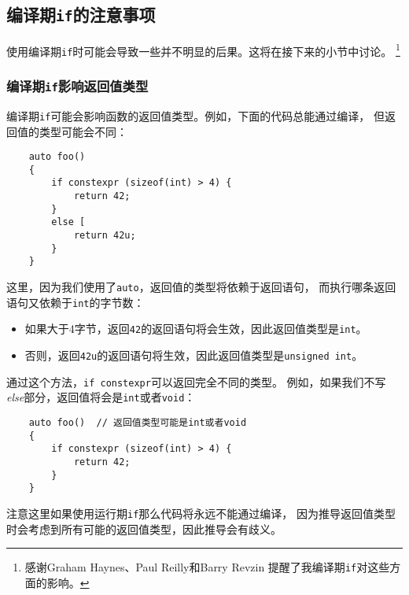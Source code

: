 \subsection{编译期\texttt{if}的注意事项}
使用编译期\texttt{if}时可能会导致一些并不明显的后果。这将在接下来的小节中讨论。
\footnote{感谢Graham Haynes、Paul Reilly和Barry Revzin
提醒了我编译期\texttt{if}对这些方面的影响。}

\subsubsection*{编译期\texttt{if}影响返回值类型}
编译期\texttt{if}可能会影响函数的返回值类型。例如，下面的代码总能通过编译，
但返回值的类型可能会不同：
\begin{lstlisting}
    auto foo()
    {
        if constexpr (sizeof(int) > 4) {
            return 42;
        }
        else [
            return 42u;
        }
    }
\end{lstlisting}
这里，因为我们使用了\texttt{auto}，返回值的类型将依赖于返回语句，
而执行哪条返回语句又依赖于\texttt{int}的字节数：
\begin{itemize}[leftmargin=*]
    \item 如果大于4字节，返回\texttt{42}的返回语句将会生效，因此返回值类型是\texttt{int}。
    \item 否则，返回\texttt{42u}的返回语句将生效，因此返回值类型是\texttt{unsigned int}。
\end{itemize}
通过这个方法，\texttt{if constexpr}可以返回完全不同的类型。
例如，如果我们不写\emph{else}部分，返回值将会是\texttt{int}或者\texttt{void}：
\begin{lstlisting}
    auto foo()  // 返回值类型可能是int或者void
    {
        if constexpr (sizeof(int) > 4) {
            return 42;
        }
    }
\end{lstlisting}
注意这里如果使用运行期\texttt{if}那么代码将永远不能通过编译，
因为推导返回值类型时会考虑到所有可能的返回值类型，因此推导会有歧义。

